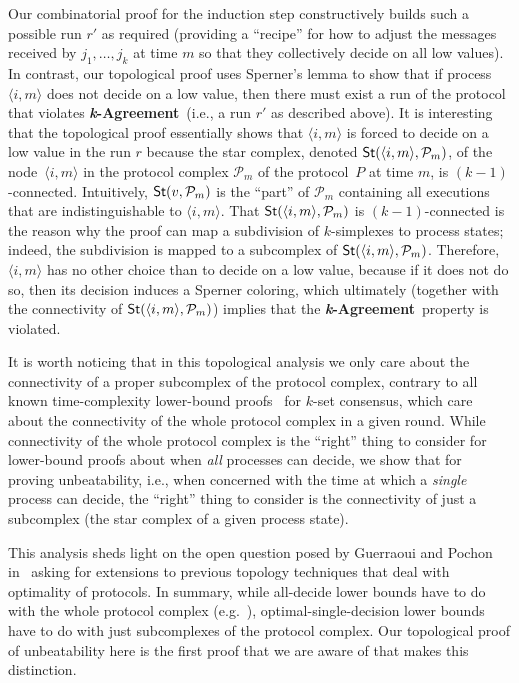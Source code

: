 \documentclass[11pt]{article}
\theoremstyle{definition}
\newcommand{\defemph}[1]{\textbf{\textit{#1}}}
\DeclareMathOperator{\Star}{\sf St}
\newcommand{\ang}[1]{\langle{#1}\rangle}
\newcommand{\cP}{\ensuremath{\mathcal{P}}}
\newcommand{\kAgreement}{{\bf \defemph{k}-Agreement}}
\begin{document}
Our combinatorial proof for the induction step constructively builds such a possible run $r'$ as required (providing a ``recipe'' for how to adjust the messages received by $j_1,\ldots,j_k$ at time $m$ so that they collectively decide on all low values).
In contrast, our topological proof uses Sperner's
lemma to show that if process $\ang{i,m}$ does not decide on a low value, then there must exist a run of the protocol that violates \kAgreement\
(i.e., a run $r'$ as described above).
It is interesting that the topological proof essentially shows that
$\ang{i,m}$ is forced to decide on a low value in the run $r$ because the star complex, denoted $\Star(\ang{i,m}, \cP_m)$,
of the node~$\ang{i,m}$ in the protocol complex $\cP_m$ of the protocol~$P$ at time $m$, is $(k-1)$-connected.
Intuitively,
$\Star(v, {\cal P}_m)$
is the ``part'' of $\cP_m$ containing all executions
that are indistinguishable to $\ang{i,m}$.
That $\Star(\ang{i,m}, \cP_m)$ is $(k-1)$-connected is the reason why the proof can map a subdivision of
$k$-simplexes
to process states; indeed, the subdivision is mapped to a subcomplex of $\Star(\ang{i,m}, \cP_m)$.
Therefore, $\ang{i,m}$ has no other choice than to decide on a low value,
because if it does not do so, then its decision induces a Sperner coloring,
which ultimately (together with the connectivity of $\Star(\ang{i,m}, \cP_m)$)  implies that the \kAgreement\ property is violated.

It is worth noticing that in this topological analysis we only
care about the connectivity of a proper subcomplex of the protocol complex,
contrary to all known time-complexity lower-bound proofs~\cite{GHP,HRT98}
for $k$-set consensus, which care about the
connectivity of the whole protocol complex
in a given round.
While connectivity of the whole protocol complex is the ``right'' thing to consider for lower-bound proofs about when
\emph{all} processes can decide,
we show that for proving unbeatability, i.e., when
concerned with the time at which a \emph{single}
process can decide,
the ``right'' thing to consider is the connectivity of just
a subcomplex
(the star complex of a given process state).

This analysis sheds light on the open question posed by Guerraoui and Pochon in~\cite{GP09}
asking for extensions to previous topology techniques that deal with
optimality of protocols.
In summary, while all-decide lower bounds have to do with
the whole protocol complex (e.g.~\cite{HRT98}),
optimal-single-decision lower bounds have to do
with just subcomplexes of the protocol complex. Our topological proof of unbeatability
here is the first proof that we are aware of that makes this distinction.
\end{document}
